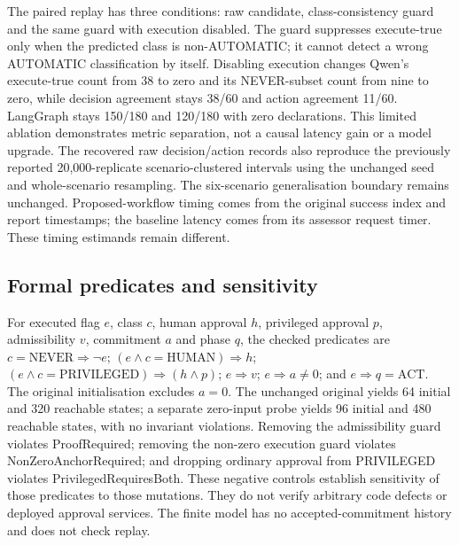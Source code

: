 \documentclass[journal]{IEEEtran}
\newif\ifshowrevisions
\newenvironment{revision}{\begingroup\ifshowrevisions\color{blue}\else\color{black}\fi}{\endgroup}
\begin{document}
\begin{revision}
The paired replay has three conditions: raw candidate, class-consistency guard
and the same guard with execution disabled. The guard suppresses execute-true
only when the predicted class is non-AUTOMATIC; it cannot detect a wrong
AUTOMATIC classification by itself. Disabling execution changes Qwen's
execute-true count from 38 to zero and its NEVER-subset count from nine to zero,
while decision agreement stays 38/60 and action agreement 11/60. LangGraph
stays 150/180 and 120/180 with zero declarations. This limited ablation
demonstrates metric separation, not a causal latency gain or a model upgrade.
The recovered raw decision/action records also reproduce the previously
reported 20,000-replicate scenario-clustered intervals using the unchanged
seed and whole-scenario resampling. The six-scenario generalisation boundary
remains unchanged. Proposed-workflow timing comes from the original success
index and report timestamps; the baseline latency comes from its assessor
request timer. These timing estimands remain different.

\subsection{Formal predicates and sensitivity}
For executed flag $e$, class $c$, human approval $h$, privileged approval $p$,
admissibility $v$, commitment $a$ and phase $q$, the checked predicates are
$c=\mathrm{NEVER}\Rightarrow\neg e$;
$(e\land c=\mathrm{HUMAN})\Rightarrow h$;
$(e\land c=\mathrm{PRIVILEGED})\Rightarrow(h\land p)$;
$e\Rightarrow v$; $e\Rightarrow a\ne0$; and
$e\Rightarrow q=\mathrm{ACT}$. The original initialisation excludes $a=0$.
The unchanged original yields 64 initial and 320 reachable states; a separate
zero-input probe yields 96 initial and 480 reachable states, with no invariant
violations. Removing the admissibility guard violates ProofRequired; removing
the non-zero execution guard violates NonZeroAnchorRequired; and dropping
ordinary approval from PRIVILEGED violates PrivilegedRequiresBoth. These
negative controls establish sensitivity of those predicates to those mutations.
They do not verify arbitrary code defects or deployed approval services.
The finite model has no accepted-commitment history and does not check replay.


\end{revision}
\end{document}
